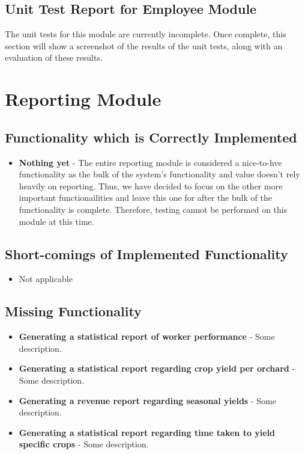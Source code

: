 \documentclass[11pt,fleqn]{book} %
\begin{document}
		\subsection{Unit Test Report for Employee Module}
			The unit tests for this module are currently incomplete. Once complete, this section will show a screenshot of the results of the unit tests, along with an evaluation of these results.
			
	\section{Reporting Module}
		\subsection{Functionality which is Correctly Implemented}
			\begin{itemize}
				\item\textbf{Nothing yet} -
				The entire reporting module is considered a nice-to-hve functionality as the bulk of the system's functionality and value doesn't rely heavily on reporting. Thus, we have decided to focus on the other more important functionailities and leave this one for after the bulk of the functionality is complete. Therefore, testing cannot be performed on this module at this time.
			\end{itemize}
		\subsection{Short-comings of Implemented Functionality}
			\begin{itemize}
				\item{Not applicable}
			\end{itemize}
		\subsection{Missing Functionality}
			\begin{itemize}
				\item\textbf{Generating a statistical report of worker performance} -
				Some description.
				
				\item\textbf{Generating a statistical report regarding crop yield per orchard} -
				Some description.
				
				\item\textbf{Generating a revenue report regarding seasonal yields} -
				Some description.
				
				\item\textbf{Generating a statistical report regarding time taken to yield specific crops} -
				Some description.
			\end{itemize}
\end{document}
